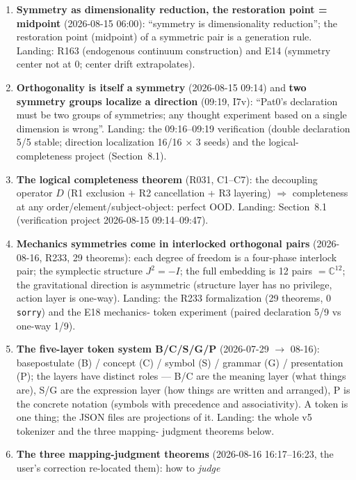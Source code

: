 \documentclass[sigplan,10pt,anonymous,review]{acmart}
\begin{document}
\begin{enumerate}
declared (R136: directions must be declared in pairs $\{d,-d\}$, twice
declared = asymmetry). Landing: the paired-declaration law and E18
(paired 5/9 vs one-way 1/9).
\item \textbf{Symmetry as dimensionality reduction, the restoration
point = midpoint} (2026-08-15 06:00): ``symmetry is dimensionality
reduction''; the restoration point (midpoint) of a symmetric pair is a
generation rule. Landing: R163 (endogenous continuum construction) and
E14 (symmetry center not at 0; center drift extrapolates).
\item \textbf{Orthogonality is itself a symmetry} (2026-08-15 09:14) and
\textbf{two symmetry groups localize a direction} (09:19, I7v): ``Pat0's
declaration must be two groups of symmetries; any thought experiment based
on a single dimension is wrong''. Landing: the 09:16--09:19 verification
(double declaration 5/5 stable; direction localization 16/16 $\times$ 3
seeds) and the logical-completeness project (Section~8.1).
\item \textbf{The logical completeness theorem} (R031, C1--C7): the
decoupling operator $D$ (R1 exclusion + R2 cancellation + R3 layering)
$\Longrightarrow$ completeness at any order/element/subject-object:
perfect OOD. Landing: Section~8.1 (verification project 2026-08-15
09:14--09:47).
\item \textbf{Mechanics symmetries come in interlocked orthogonal pairs}
(2026-08-16, R233, 29 theorems): each degree of freedom is a four-phase
interlock pair; the symplectic structure $J^2=-I$; the full embedding is
12 pairs $= \mathbb C^{12}$; the gravitational direction is asymmetric
(structure layer has no privilege, action layer is one-way). Landing: the
R233 formalization (29 theorems, 0 \texttt{sorry}) and the E18 mechanics-
token experiment (paired declaration 5/9 vs one-way 1/9).
\item \textbf{The five-layer token system B/C/S/G/P} (2026-07-29 $\to$
08-16): basepostulate (B) / concept (C) / symbol (S) / grammar (G) /
presentation (P); the layers have distinct roles --- B/C are the meaning
layer (what things are), S/G are the expression layer (how things are
written and arranged), P is the concrete notation (symbols with
precedence and associativity). A token is one thing; the JSON files are
projections of it. Landing: the whole v5 tokenizer and the three mapping-
judgment theorems below.
\item \textbf{The three mapping-judgment theorems} (2026-08-16
16:17--16:23, the user's correction re-located them): how to \emph{judge}

\end{enumerate}
\end{document}

